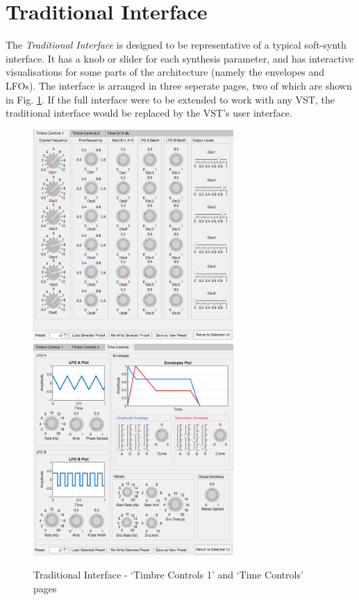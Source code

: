 \documentclass[11pt, oneside]{report}   	%
\begin{document}
\section{Traditional Interface}
\vspace{-5pt}
The \emph{Traditional Interface} is designed to be representative of a typical soft-synth interface. It has a knob or slider for each synthesis parameter, and has interactive visualisations for some parts of the architecture (namely the envelopes and LFOs). The interface is arranged in three seperate pages, two of which are shown in Fig. \ref{fig:TraditionalInterface}. 
If the full interface were to be extended to work with any VST, the traditional interface would be replaced by the VST's user interface. \vspace{-15pt}
\begin{figure}[h!] 
	\vspace{-5pt}
	\centering
	\hspace*{-0.2cm}
\includegraphics[width = 3in]{TraditionalUI1.png}
\hspace*{0.2cm}
	\includegraphics[width = 3in]{TraditionalUI3.png}
	\caption{Traditional Interface - `Timbre Controls 1' and `Time Controls' pages}
	\label{fig:TraditionalInterface}
	\vspace{-20pt}
\end{figure}
\end{document}
